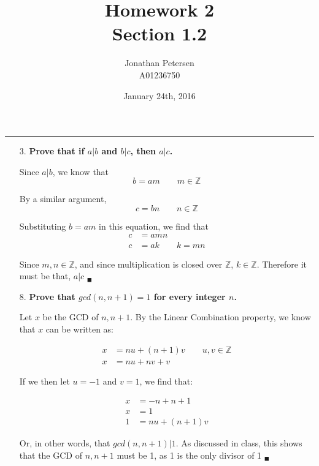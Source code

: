 \documentclass{article}
\title{Homework 2 \\ Section 1.2}
\author{Jonathan Petersen \\ A01236750}
\date{January 24th, 2016}
\begin{document}
	\maketitle
	\hrule
	\begin{enumerate}
		\item[3.]	\textbf{Prove that if $a | b$ and $b | c$, then $a | c$.}

			Since $a | b$, we know that
			\begin{equation*}
				b = am \qquad m \in \mathbb{Z}
			\end{equation*}

			By a similar argument,
			\begin{equation*}
				c = bn \qquad n \in \mathbb{Z}
			\end{equation*}

			Substituting $b = am$ in this equation, we find that
			\begin{align*}
				c &= amn \\
				c &= ak \qquad k = mn
			\end{align*}

			Since $m, n \in \mathbb{Z}$, and since multiplication is closed over $\mathbb{Z}$,
			$k \in \mathbb{Z}$. Therefore it must be that, $a | c$ $_{\blacksquare}$

		\item[8.]	\textbf{Prove that $gcd(n, n+1) = 1$ for every integer $n$.}

			Let $x$ be the GCD of $n, n+1$. By the Linear Combination property, we know that $x$ 
			can be written as:

			\begin{align*}
				x &= nu + (n+1)v \qquad u, v \in \mathbb{Z} \\
				x &= nu + nv + v
			\end{align*}

			If we then let $u = -1$ and $v = 1$, we find that:

			\begin{align*}
				x &= -n + n + 1 \\
				x &= 1 \\
				1 &= nu + (n+1)v
			\end{align*}

			Or, in other words, that $gcd(n, n+1) | 1$. As discussed in class, this shows that the 
			GCD of $n, n+1$ must be 1, as 1 is the only divisor of 1 $_{\blacksquare}$



\end{enumerate}
\end{document}
